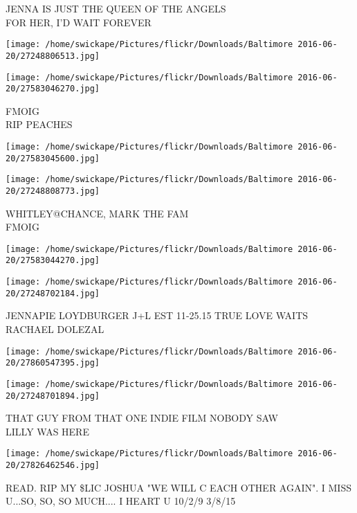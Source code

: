 \documentclass[10pt,letterpaper]{article}
\begin{document}
JENNA IS JUST THE QUEEN OF THE ANGELS\\
FOR HER, I'D WAIT FOREVER\\
\pagebreak

\texttt{[image: /home/swickape/Pictures/flickr/Downloads/Baltimore 2016-06-20/27248806513.jpg]}

\vspace{0.25in}
\texttt{[image: /home/swickape/Pictures/flickr/Downloads/Baltimore 2016-06-20/27583046270.jpg]}

FMOIG\\
RIP PEACHES\\
\pagebreak

\texttt{[image: /home/swickape/Pictures/flickr/Downloads/Baltimore 2016-06-20/27583045600.jpg]}

\vspace{0.25in}
\texttt{[image: /home/swickape/Pictures/flickr/Downloads/Baltimore 2016-06-20/27248808773.jpg]}

WHITLEY@CHANCE, MARK THE FAM\\
FMOIG\\
\pagebreak

\texttt{[image: /home/swickape/Pictures/flickr/Downloads/Baltimore 2016-06-20/27583044270.jpg]}

\vspace{0.25in}
\texttt{[image: /home/swickape/Pictures/flickr/Downloads/Baltimore 2016-06-20/27248702184.jpg]}

JENNAPIE LOYDBURGER J+L EST 11{-}25.15 TRUE LOVE WAITS\\
RACHAEL DOLEZAL\\
\pagebreak

\texttt{[image: /home/swickape/Pictures/flickr/Downloads/Baltimore 2016-06-20/27860547395.jpg]}

\vspace{0.25in}
\texttt{[image: /home/swickape/Pictures/flickr/Downloads/Baltimore 2016-06-20/27248701894.jpg]}

THAT GUY FROM THAT ONE INDIE FILM NOBODY SAW\\
LILLY WAS HERE\\
\pagebreak

\texttt{[image: /home/swickape/Pictures/flickr/Downloads/Baltimore 2016-06-20/27826462546.jpg]}

READ.  RIP MY \$LIC JOSHUA "WE WILL C EACH OTHER AGAIN".  I MISS U...SO, SO, SO MUCH.... I HEART U 10/2/9 3/8/15\\
\pagebreak
\end{document}
